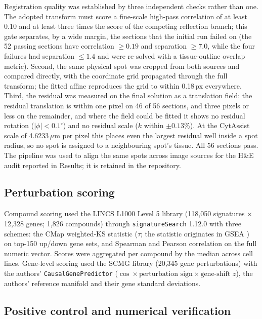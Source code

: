 Registration quality was established by three independent checks rather than one. The
adopted transform must score a fine-scale high-pass correlation of at least 0.10 and at
least three times the score of the competing reflection branch; this gate separates, by a
wide margin, the sections that the initial run failed on (the 52 passing sections have
correlation $\geq 0.19$ and separation $\geq 7.0$, while the four failures had separation
$\leq 1.4$ and were re-solved with a tissue-outline overlap metric). Second, the same
physical spot was cropped from both sources and compared directly, with the coordinate grid
propagated through the full transform; the fitted affine reproduces the grid to within
0.18\,px everywhere. Third, the residual was measured on the final solution as a translation field: the
residual translation is within one pixel on 46 of 56 sections, and three pixels or less on
the remainder, and where the field could be fitted it shows no residual rotation
($|\phi| < 0.1^\circ$) and no residual scale ($k$ within $\pm0.13\%$). At the CytAssist
scale of 4.6233\,$\mu$m per pixel this places even the largest residual well inside a spot
radius, so no spot is assigned to a neighbouring spot's tissue. All 56 sections pass. The
pipeline was used to align the same spots across image sources for the H\&E audit reported
in Results; it is retained in the repository.

\subsection{Perturbation scoring}

Compound scoring used the LINCS L1000 Level 5 library \citep{subramanian2017} (118,050
signatures $\times$ 12,328 genes; 1,826 compounds) through \texttt{signatureSearch}
\citep{duan2020signaturesearch} 1.12.0 with three schemes: the CMap weighted-KS statistic
($\tau$; the statistic originates in GSEA \citep{subramanian2005gsea}) on top-150 up/down
gene sets, and Spearman and Pearson correlation on the full numeric vector. Scores were
aggregated per compound by the median across cell lines. Gene-level scoring used the SCMG
library (20,345 gene perturbations)
with the authors' \texttt{CausalGenePredictor}
($\cos \times \text{perturbation sign} \times \text{gene-shift } z$), the authors' reference
manifold and their gene standard deviations.

\subsection{Positive control and numerical verification}

